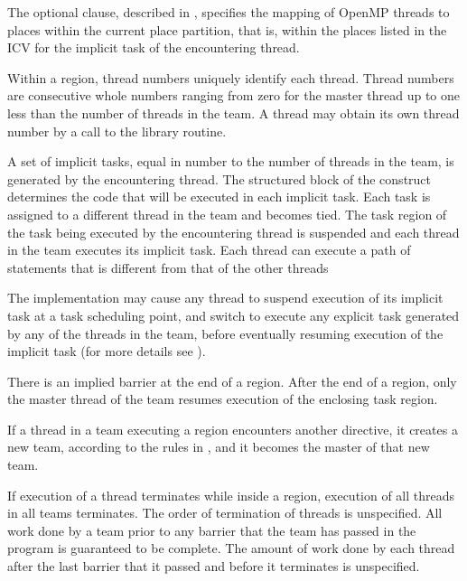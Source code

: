 The optional  clause, described in 
, specifies the 
mapping of OpenMP threads to places within the current place partition, that is, within 
the places listed in the  ICV for the implicit task of the encountering 
thread.

Within a  region, thread numbers uniquely identify each thread. Thread 
numbers are consecutive whole numbers ranging from zero for the master thread up to 
one less than the number of threads in the team. A thread may obtain its own thread 
number by a call to the  library routine.

A set of implicit tasks, equal in number to the number of threads in the team, is 
generated by the encountering thread. The structured block of the  construct 
determines the code that will be executed in each implicit task. Each task is assigned to 
a different thread in the team and becomes tied. The task region of the task being 
executed by the encountering thread is suspended and each thread in the team executes 
its implicit task. Each thread can execute a path of statements that is different from that 
of the other threads

The implementation may cause any thread to suspend execution of its implicit task at a 
task scheduling point, and switch to execute any explicit task generated by any of the 
threads in the team, before eventually resuming execution of the implicit task (for more 
details see ).

There is an implied barrier at the end of a  region. After the end of a 
 region, only the master thread of the team resumes execution of the 
enclosing task region.

If a thread in a team executing a  region encounters another  
directive, it creates a new team, according to the rules in 
, 
and it becomes the master of that new team.

If execution of a thread terminates while inside a  region, execution of all 
threads in all teams terminates. The order of termination of threads is unspecified. All 
work done by a team prior to any barrier that the team has passed in the program is 
guaranteed to be complete. The amount of work done by each thread after the last 
barrier that it passed and before it terminates is unspecified.

